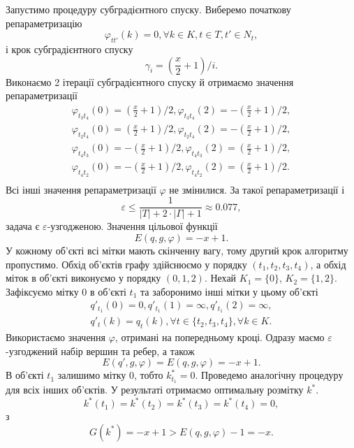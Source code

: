 Запустимо процедуру субградієнтного спуску. Виберемо початкову репараметризацію
\begin{equation}
    \varphi_{tt'}(k)=0,\forall k\in K, t\in T, t'\in N_t,
\end{equation}
і крок субградієнтного спуску 
\begin{equation}
    \gamma_i=\left(\frac{x}{2}+1\right)/i.
\end{equation}
Виконаємо 2 ітерації субградієнтного спуску й отримаємо значення репараметризації 
\begin{equation}
    \begin{aligned}
       \varphi_{t_3t_4}(0)=\left(\frac{x}{2}+1\right)/2, \varphi_{t_3t_4}(2)=-\left(\frac{x}{2}+1\right)/2,\\
       \varphi_{t_2t_4}(0)=\left(\frac{x}{2}+1\right)/2, \varphi_{t_2t_4}(2)=-\left(\frac{x}{2}+1\right)/2,\\
       \varphi_{t_4t_3}(0)=-\left(\frac{x}{2}+1\right)/2, \varphi_{t_4t_3}(2)=\left(\frac{x}{2}+1\right)/2,\\
       \varphi_{t_4t_2}(0)=-\left(\frac{x}{2}+1\right)/2, \varphi_{t_4t_2}(2)=\left(\frac{x}{2}+1\right)/2.\\
    \end{aligned}
\end{equation}
Всі інші значення репараметризації $\varphi$ не змінилися. За такої репараметризації і 
\begin{equation}
    \varepsilon\leq \frac{1}{|T|+2\cdot|\Gamma|+1}\approx 0.077,
\end{equation}
задача є $\varepsilon$-узгодженою.
Значення цільової функції 
\begin{equation}
    E(q,g,\varphi)=-x+1.
\end{equation}
У кожному об'єкті всі мітки мають скінченну вагу, тому другий крок алгоритму пропустимо.
Обхід об'єктів графу здійснюємо у порядку $(t_1,t_2,t_3,t_4)$, а обхід міток в 
об'єкті виконуємо у порядку $(0,1,2)$. Нехай $K_1=\{0\}$, $K_2=\{1,2\}$. Зафіксуємо мітку $0$ в 
об'єкті $t_1$ та заборонимо інші мітки у цьому об'єкті
\begin{equation}
    \begin{aligned}
    q'_{t_1}(0)=0,q'_{t_1}(1)=\infty,q'_{t_1}(2)=\infty,\\
    q'_t(k)=q_t(k),\forall t\in \{t_2,t_3,t_4\}, \forall k\in K.
    \end{aligned}
\end{equation}
Використаємо значення $\varphi$, отримані на попередньому кроці. Одразу маємо 
$\varepsilon$-узгоджений набір вершин та ребер, а також 
\begin{equation}
    E(q',g,\varphi)=E(q,g,\varphi)=-x+1.
\end{equation}
В об'єкті $t_1$ залишимо мітку $0$, тобто $k^*_{t_1}=0$. Проведемо аналогічну процедуру 
для всіх інших об'єктів. У результаті отримаємо оптимальну розмітку $k^*$.
\begin{equation}
    k^*(t_1)=k^*(t_2)=k^*(t_3)=k^*(t_4)=0,
\end{equation}
з
\begin{equation}
    G(k^*)=-x+1>E(q,g,\varphi)-1=-x.
\end{equation}

